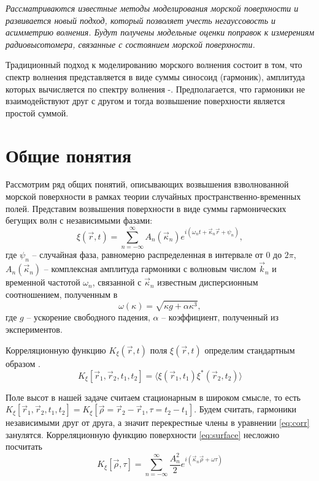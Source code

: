\documentclass[a4paper,14pt]{extarticle}
\newcommand{\mean}[1]{\langle#1\rangle}
\renewcommand{\qty}{ }
\begin{document}
\textit{
Рассматриваются известные методы моделирования морской поверхности и
развивается новый подход, который позволяет учесть негауссовость и
асимметрию волнения. Будут получены модельные оценки поправок к измерениям
радиовысотомера, связанные с состоянием морской поверхности.
}



Традиционный подход к моделированию морского волнения состоит в том, что
спектр волнения представляется в виде суммы синосоид (гармоник), амплитуда
которых вычисляется по спектру волнения \cite{cite:1}-\cite{cite:3}.
Предполагается, что гармоники не взаимодействуют друг с другом и тогда
возвышение поверхности является простой суммой.

\section{Общие понятия}%
\label{sec:obshchie_poniatiia}
Рассмотрим ряд общих понятий, описывающих возвышения взволнованной морской поверхности в рамках теории случайных пространственно-временных
полей. Представим возвышения поверхности в виде суммы гармонических бегущих волн с независимыми фазами:
\begin{equation}
    \label{eq:surface}
    \xi(\vec r,t) = \sum\limits_{n=-\infty}^{\infty} 
        A_n(\vec \kappa_n) e^{i(\omega_n t + \vec \kappa_n \vec r + \psi_n)},
\end{equation}
где $\psi_n$ -- случайная фаза,
равномерно распределенная в интервале от $0$ до  $2 \pi$, 
$A_n (\vec \kappa_n)$ -- комплексная амплитуда гармоники с волновым числом
$\vec k_n$ и временной частотой  $\omega_n$, связанной с  $\vec \kappa_n$ известным
дисперсионным соотношением, полученным в \cite{cite:4}
\begin{equation}
    \omega(\kappa) = \sqrt{\kappa g + \alpha \kappa^3},
\end{equation}
где $g$ -- ускорение свободного падения,  $\alpha$ -- коэффициент, полученный
из экспериментов.


Корреляционную функцию $K_{\xi}(\vec r,t)$ поля  $\xi(\vec r, t) $ определим
стандартным образом \cite{cite:corr}.
 \begin{equation}
    \label{eq:corr}
    K_{\xi}\qty[\vec r_1, \vec r_2, t_1,t_2] = \mean{\xi(\vec r_1,t_1)\xi^*(\vec r_2,t_2)}
\end{equation}

Поле высот в нашей задаче считаем стационарным в широком смысле, то есть 
$K_{\xi}\qty[\vec r_{1},\vec r_{2},t_{1},t_{2}] = K_{\xi}\qty[\vec \rho = \vec
r_{2} - \vec r_1, \tau=t_{2}-t_{1}]$. Будем считать, гармоники
независимыми друг от друга, а значит перекрестные члены в уравнении
\eqref{eq:corr} занулятся.
Корреляционную функцию поверхности
\eqref{eq:surface} несложно посчитать
\begin{equation}
    \label{eq:surface_corr}
    K_{\xi}\qty[\vec \rho,\tau] = \sum\limits_{n=-\infty}^{\infty} 
    \frac{A_n^2}{2} 
    e^{i \qty(\vec \kappa_n \vec \rho + \omega \tau)}
\end{equation}
\end{document}
